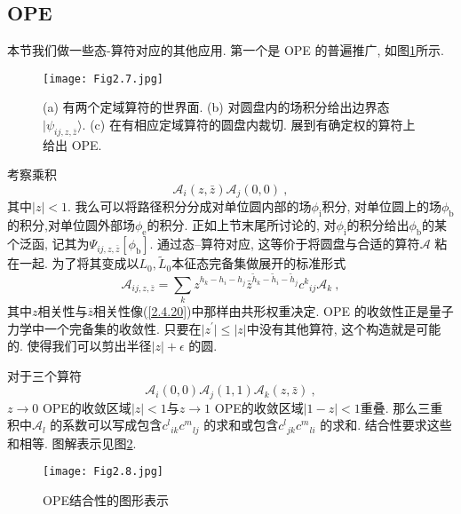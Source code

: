 \subsection*{OPE}
本节我们做一些态-算符对应的其他应用. 第一个是 OPE 的普遍推广, 如图\ref{Fig2.7}所示.
\begin{figure}[h]
	\begin{center}
		\texttt{[image: Fig2.7.jpg]}
\caption{(a) 有两个定域算符的世界面. (b) 对圆盘内的场积分给出边界态$\lvert\psi_{i j, z, \bar{z}}\rangle$. (c) 在有相应定域算符的圆盘内裁切. 展到有确定权的算符上给出 OPE.}\label{Fig2.7}
	\end{center}
\end{figure}
考察乘积
\begin{equation}
\mathscr{A}_{i}(z, \bar{z}) \mathscr{A}_{j}(0,0) \:, \label{2.9.1}
\end{equation}
其中$|z|<1$. 我么可以将路径积分分成对单位圆内部的场$\phi_{\mathrm{i}}$积分, 对单位圆上的场$\phi_{\mathrm{b}}$的积分,对单位圆外部场$\phi_{\mathrm{e}}$的积分. 正如上节末尾所讨论的, 对$\phi_{\mathrm{i}}$的积分给出$\phi_{\mathrm{b}}$的某个泛函, 记其为$\Psi_{i j, z, \bar{z}}[\phi_{\mathrm{b}}]$. 通过态--算符对应, 这等价于将圆盘与合适的算符$\mathscr{A}$ 粘在一起. 为了将其变成以$L_{0}, \tilde{L}_{0}$本征态完备集做展开的标准形式
\begin{equation}
\mathscr{A}_{i j, z, \bar{z}}=\sum_{k} z^{h_{k}-h_{i}-h_{j}}\bar{z}^{\tilde{h}_{k}-\tilde{h}_{i}-\tilde{h}_{j} }c^{k}{}_{i j} \mathscr{A}_{k} \:, \label{2.9.2}
\end{equation}
其中$z$相关性与$\bar{z}$相关性像(\ref{2.4.20})中那样由共形权重决定. OPE 的收敛性正是量子力学中一个完备集的收敛性. 只要在$\lvert z^{\prime}\rvert \leq \lvert z\rvert $中没有其他算符, 这个构造就是可能的. 使得我们可以剪出半径$|z|+\epsilon$ 的圆.

对于三个算符
\begin{equation}
\mathscr{A}_{i}(0,0) \mathscr{A}_{j}(1,1) \mathscr{A}_{k}(z, \bar{z}) \:, \label{2.9.3}
\end{equation}
$z\to 0$ OPE的收敛区域$|z|<1$与$z\to 1$ OPE的收敛区域$|1-z|<1$重叠. 那么三重积中$\mathscr{A}_l$ 的系数可以写成包含$c^{l}{}_{i k} 
c^{m}{}_{l j}$ 的求和或包含$c^{l}{}_{j k} c^{m}{}_{li}$ 的求和. 结合性要求这些和相等. 图解表示见图\ref{Fig2.8}.
\begin{figure}[h]
	\begin{center}
		\texttt{[image: Fig2.8.jpg]}
		\caption{OPE结合性的图形表示}\label{Fig2.8}
	\end{center}
\end{figure}

